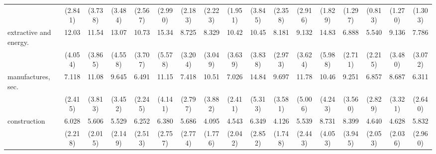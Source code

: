 {\begin{tabular}{l*{16}{c}}
                    &     (2.841)         &     (3.738)         &     (3.484)         &     (2.567)         &     (2.990)         &     (2.183)         &     (2.223)         &     (1.951)         &     (3.845)         &     (2.358)         &     (2.916)         &     (1.829)         &     (1.297)         &     (0.813)         &     (1.270)         &     (1.303)         \\
[1em]
extractive and energy.&       12.03\sym{***}&       11.54\sym{***}&       13.07\sym{***}&       10.73\sym{***}&       15.34\sym{***}&       8.725\sym{***}&       8.329\sym{***}&       10.42\sym{***}&       10.45\sym{***}&       8.181\sym{***}&       9.132\sym{***}&       14.83\sym{***}&       6.888\sym{***}&       5.540\sym{***}&       9.136\sym{***}&       7.786\sym{***}\\
                    &     (4.054)         &     (3.865)         &     (4.558)         &     (3.707)         &     (5.578)         &     (3.204)         &     (3.049)         &     (3.639)         &     (3.838)         &     (2.973)         &     (3.624)         &     (5.988)         &     (2.711)         &     (2.215)         &     (3.480)         &     (3.072)         \\
[1em]
manufactures, sec.  &       7.118\sym{***}&       11.08\sym{***}&       9.645\sym{***}&       6.491\sym{***}&       11.15\sym{***}&       7.418\sym{***}&       10.51\sym{***}&       7.026\sym{***}&       14.84\sym{***}&       9.697\sym{***}&       11.78\sym{***}&       10.46\sym{***}&       9.251\sym{***}&       6.857\sym{***}&       8.687\sym{***}&       6.311\sym{***}\\
                    &     (2.415)         &     (3.813)         &     (3.452)         &     (2.245)         &     (4.141)         &     (2.797)         &     (3.882)         &     (2.411)         &     (5.313)         &     (3.581)         &     (5.006)         &     (4.243)         &     (3.560)         &     (2.829)         &     (3.321)         &     (2.640)         \\
[1em]
construction        &       6.028\sym{***}&       5.606\sym{***}&       5.529\sym{***}&       6.252\sym{***}&       6.380\sym{***}&       5.686\sym{***}&       4.095\sym{**} &       4.543\sym{***}&       6.349\sym{***}&       4.126\sym{***}&       5.539\sym{***}&       8.731\sym{***}&       8.399\sym{***}&       4.640\sym{***}&       4.628\sym{***}&       5.832\sym{***}\\
                    &     (2.218)         &     (2.015)         &     (2.149)         &     (2.513)         &     (2.757)         &     (2.774)         &     (1.776)         &     (2.042)         &     (2.852)         &     (1.748)         &     (2.443)         &     (4.053)         &     (3.945)         &     (2.053)         &     (2.036)         &     (2.960)         \\

\end{tabular}}
